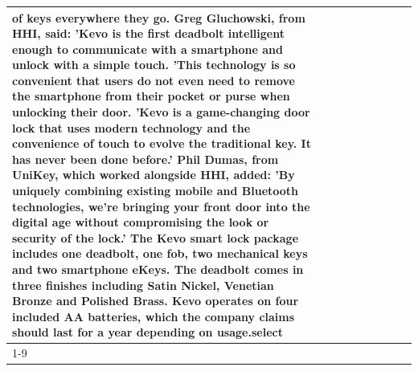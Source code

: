 \begin{table}[H]
\begin{tabular}{lllrlllll}
of keys everywhere they go. Greg Gluchowski, from HHI, said: 'Kevo is the first deadbolt intelligent enough to communicate with a smartphone and unlock with a simple touch. 'This technology is so convenient that users do not even need to remove the smartphone from their pocket or purse when unlocking their door. 'Kevo is a game-changing door lock that uses modern technology and the convenience of touch to evolve the traditional key. It has never been done before.' Phil Dumas, from UniKey, which worked alongside HHI, added: 'By uniquely combining existing mobile and Bluetooth technologies, we’re bringing your front door into the digital age without compromising the look or security of the lock.' The Kevo smart lock package includes one deadbolt, one fob, two mechanical keys and two smartphone eKeys. The deadbolt comes in three finishes including Satin Nickel, Venetian Bronze and Polished Brass. Kevo operates on four included AA batteries, which the company claims should last for a year depending on usage.select \\
\cline{1-9}

\end{tabular}
\end{table}
